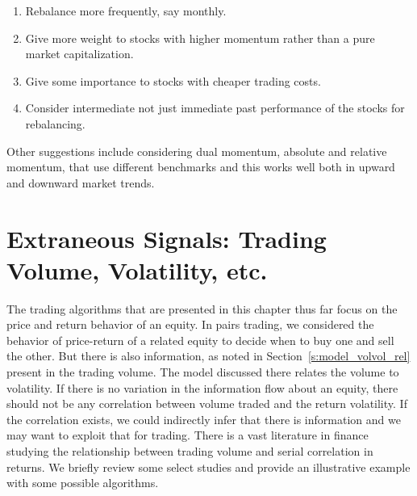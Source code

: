 \begin{enumerate}[--]
\item Rebalance more frequently, say monthly.
\item Give more weight to stocks with higher momentum rather than a pure market capitalization.
\item Give some importance to stocks with cheaper trading costs.
\item Consider intermediate not just immediate past performance of the stocks for rebalancing.
\end{enumerate} 


Other suggestions include considering dual momentum, absolute and relative momentum, that use different benchmarks and this works well both in upward and downward market trends. 



\section{Extraneous Signals: Trading Volume, Volatility, etc.}

The trading algorithms that are presented in this chapter thus far focus on the price and return behavior of an equity. In pairs trading, we considered the behavior of price-return of a related equity to decide when to buy one and sell the other. But there is also information, as noted in Section~\ref{s:model_volvol_rel} present in the trading volume. The model discussed there relates the volume to volatility. If there is no variation in the information flow about an equity, there should not be any correlation between volume traded and the return volatility. If the correlation exists, we could indirectly infer that there is information and we may want to exploit that for trading. There is a vast literature in finance studying the relationship between trading volume and serial correlation in returns. We briefly review some select studies and provide an illustrative example with some possible algorithms. 


